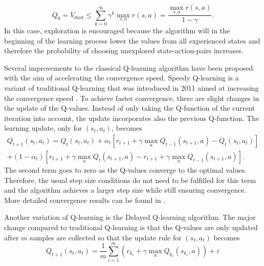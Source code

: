 \documentclass[../main.tex]{subfiles}
\begin{document}
\begin{equation}\label{eq:optimistic_init}
    Q_0 = V_{\max} \leq \sum_{k=0}^\infty \gamma^k\max_{s,a}r(s,a) = \dfrac{\max_{s,a}{r(s,a)}}{1-\gamma}.
\end{equation}
In this case, exploration is encouraged because the algorithm will in the beginning of the learning process lower the values from all experienced states and therefore the probability of choosing unexplored state-action-pairs increases. \par
Several improvements to the classical Q-learning algorithm have been proposed with the aim of accelerating the convergence speed. Speedy Q-learning is a variant of traditional Q-learning that was introduced in 2011 aimed at increasing the convergence speed \cite{azar2011speedy}. To achieve faster convergence, there are slight changes in the update of the Q-values. Instead of only taking the Q-function of the current iteration into account, the update incorporates also the previous Q-function. The learning update, only for $(s_t,a_t)$, becomes
\begin{multline}
Q_{t+1}(s_t,a_t) = Q_{t}(s_t,a_t) + \alpha_t \left[ r_{t+1}+\gamma \max_a Q_{t-1}(s_{t+1},a) - Q_{t}(s_t,a_t)\right] \\+ (1-\alpha_t) \left[ r_{t+1}+\gamma \max_a Q_{t}(s_{t+1},a) -  r_{t+1}+\gamma \max_a Q_{t-1}(s_{t+1},a)\right].
\end{multline}
The second term goes to zero as the Q-values converge to the optimal values. Therefore, the usual step size conditions do not need to be fulfilled for this term and the algorithm achieves a larger step size while still ensuring convergence. More detailed convergence results can be found in \cite{azar2011speedy}.\par
Another variation of Q-learning is the Delayed Q-learning algorithm. The major change compared to traditional Q-learning is that the Q-values are only updated after $m$ samples are collected so that the update rule for $(s_t,a_t)$ becomes
\begin{equation}\label{DelayedQ}
Q_{t+1}(s_t,a_t) = \dfrac{1}{m} \sum_{i=1}^m \left( r_{k_i} + \gamma \max_{a} Q_{k_i}(s_{k_i},a) \right) + \varepsilon
\end{equation}
\end{document}

